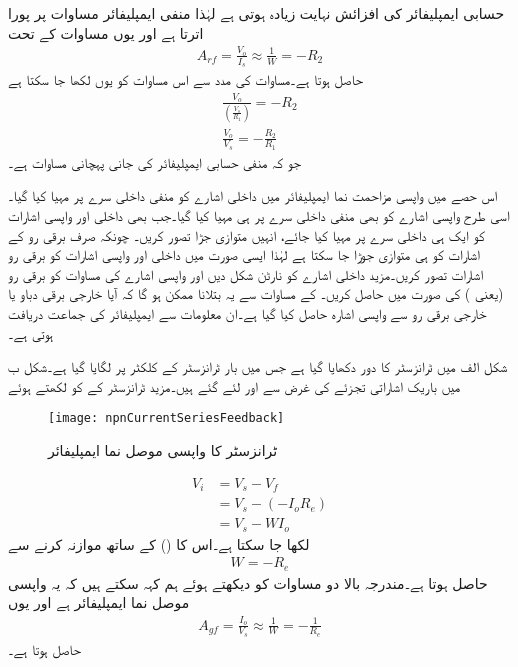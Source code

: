 حسابی ایمپلیفائر کی افزائش نہایت زیادہ ہوتی ہے لہٰذا منفی ایمپلیفائر مساوات   پر پورا اترتا ہے اور یوں مساوات  کے تحت
\begin{align}
A_{rf}=\frac{V_o}{I_s} \approx \frac{1}{W}=-R_2
\end{align}
حاصل ہوتا ہے۔مساوات  کی مدد سے اس مساوات کو یوں لکھا جا سکتا ہے
\begin{align}
\frac{V_o}{\left(\frac{V_s}{R_1} \right)}=-R_2\\
\frac{V_o}{V_s}=-\frac{R_2}{R_1}
\end{align}
جو کہ منفی حسابی ایمپلیفائر کی جانی پہچانی مساوات ہے۔

اس حصے میں واپسی مزاحمت نما ایمپلیفائر میں داخلی اشارے  کو منفی داخلی سرے پر مہیا کیا گیا۔اسی طرح واپسی اشارے کو بھی منفی داخلی سرے پر ہی مہیا کیا گیا۔جب بھی داخلی اور واپسی اشارات کو ایک ہی داخلی سرے پر مہیا کیا جائے، انہیں متوازی جڑا تصور کریں۔ چونکہ صرف برقی رو کے اشارات کو ہی متوازی جوڑا جا سکتا ہے لہٰذا ایسی صورت میں داخلی اور واپسی اشارات کو برقی رو اشارات تصور کریں۔مزید داخلی اشارے کو نارٹن شکل دیں اور واپسی اشارے کی مساوات کو برقی رو (یعنی ) کی صورت میں حاصل کریں۔ کے مساوات سے یہ بتلانا ممکن ہو گا کہ آیا خارجی برقی دباو یا خارجی برقی رو سے واپسی اشارہ حاصل کیا گیا ہے۔ان معلومات سے ایمپلیفائر کی جماعت دریافت ہوتی ہے۔

شکل  الف میں ٹرانزسٹر کا دور دکھایا گیا ہے جس میں بار  ٹرانزسٹر کے کلکٹر پر لگایا گیا ہے۔شکل  ب میں باریک اشاراتی تجزئے کی غرض سے  اور  لئے گئے ہیں۔مزید ٹرانزسٹر کے  کو  لکھتے ہوئے
\begin{figure}
\centering
\texttt{[image: npnCurrentSeriesFeedback]}
\caption{ٹرانزسٹر کا واپسی موصل نما ایمپلیفائر}
\label{شکل_واپسی_ٹرانزسٹر_موصلیت_نما_ایمپلیفائر}
\end{figure}
%
\begin{align*}
V_i&=V_s-V_f \\
&=V_s-(-I_o R_e) \\
&=V_s-W I_o
\end{align*}
لکھا جا سکتا ہے۔اس کا  () کے ساتھ موازنہ کرنے سے
\begin{align}
W=-R_e 
\end{align}
حاصل ہوتا ہے۔مندرجہ بالا دو مساوات کو دیکھتے ہوئے ہم کہہ سکتے ہیں کہ یہ واپسی موصل نما ایمپلیفائر ہے اور یوں 
\begin{align}\label{مساوات_واپسی_ٹرانزسٹر_واپسی_موصلیت_نما_افزائش}
A_{gf} =\frac{I_o}{V_s}\approx \frac{1}{W}=-\frac{1}{R_e}
\end{align}
حاصل ہوتا ہے۔

